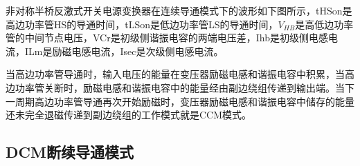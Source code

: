 非对称半桥反激式开关电源变换器在连续导通模式下的波形如下图所示，tHSon是高边功率管HS的导通时间，tLSon是低边功率管LS的导通时间，$V_{HB}$是高低边功率管的中间节点电压，VCr是初级侧谐振电容的两端电压差，Ihb是初级侧电感电流，ILm是励磁电感电流，Isec是次级侧电感电流。

当高边功率管导通时，输入电压的能量在变压器励磁电感和谐振电容中积累，当高边功率管关断时，励磁电感和谐振电容中的能量经由副边绕组传递到输出端。当下一周期高边功率管导通再次开始励磁时，变压器励磁电感和谐振电容中储存的能量还未完全退磁传递到副边绕组的工作模式就是CCM模式。

\subsection{DCM断续导通模式}

